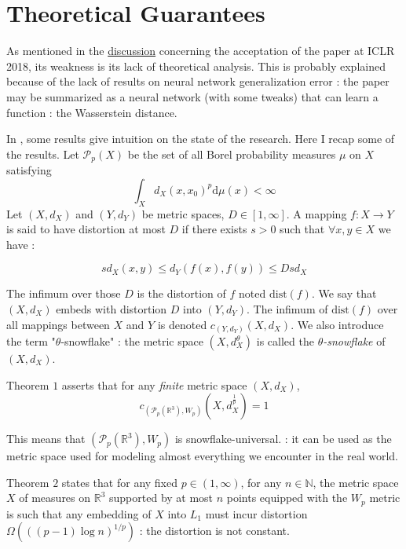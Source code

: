 \documentclass{article}
\begin{document}
\section{Theoretical Guarantees}

As mentioned in the \href{https://openreview.net/forum?id=SJyEH91A-}{discussion}  concerning the acceptation of the paper at ICLR 2018, its weakness is its lack of theoretical analysis. This is probably explained because of the lack of results on neural network generalization error : the paper may be summarized as a neural network (with some tweaks) that can learn a function : the Wasserstein distance.




In \cite{andoni2016impossibility}, some results give intuition on the state of the research. Here I recap some of the results. Let $\mathcal{P}_p(X)$ be the set of all Borel probability measures $\mu$ on $X$ satisfying
$$
\int_X d_X(x, x_0)^p \mathrm{d}\mu(x) < \infty
$$
Let $(X, d_X)$ and $(Y, d_Y)$ be metric spaces, $D \in [1, \infty]$. A mapping $f : X  \rightarrow Y$ is said to have distortion at most $D$ if there exists $s>0$ such that $\forall x, y \in X$ we have :

$$
s d_X(x, y) \leq d_Y(f(x), f(y)) \leq Ds d_X
$$

The infimum over those $D$ is the distortion of $f$ noted $\text{dist}(f)$. We say that $(X, d_X)$ embeds with distortion $D$ into $(Y, d_Y)$. The infimum of $\text{dist}(f)$ over all mappings between $X$ and $Y$ is denoted $c_{(Y, d_Y)}(X, d_X)$. We also introduce the term "$\theta$-snowflake" : the metric space $(X, d_X^{\theta})$ is called the \textit{$\theta$-snowflake} of $(X, d_X)$.

Theorem $1$ asserts that for any \textit{finite} metric space $(X, d_X)$, 
$$
c_{(\mathcal{P}_p(\mathbb{R}^3), W_p)}(X, d_X^{\frac{1}{p}}) = 1
$$

This means that $(\mathcal{P}_p(\mathbb{R}^3), W_p)$ is snowflake-universal. : it can be used as the metric space used for modeling almost everything we encounter in the real world.

Theorem $2$ states that for any fixed $p \in (1, \infty)$, for any $n \in \mathbb{N}$, the metric space $X$ of measures on $\mathbb{R}^3$ supported by at most $n$ points equipped with the $W_p$ metric is such that any embedding of $X$ into $L_1$ must incur distortion $\Omega(((p-1)\log n)^{1/p})$ : the distortion is not constant.
\end{document}
